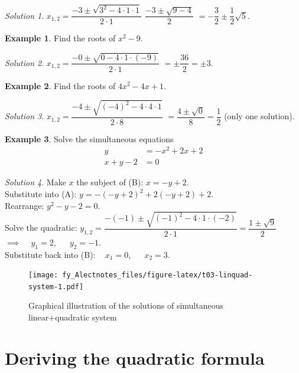 \documentclass[
  12pt,
  oneside]{book}
\theoremstyle{definition}
\theoremstyle{definition}
\newtheorem{example}{Example}[chapter]
\theoremstyle{definition}
\theoremstyle{definition}
\theoremstyle{remark}
\newtheorem*{solution}{Solution}
\begin{document}
\begin{solution}
\(x_{1,2}=\dfrac{-3\pm\sqrt{3^2-4\cdot1\cdot1}}{2\cdot 1}\) \(\dfrac{-3\pm\sqrt{9-4}}{2}\) \(=-\dfrac{3}{2}\pm\dfrac{1}{2}\sqrt{5}\).
\end{solution}

\begin{example}
Find the roots of \(x^2-9\).
\end{example}

\begin{solution}
\(x_{1,2}=\dfrac{-0\pm\sqrt{0-4\cdot1\cdot(-9)}}{2\cdot1}\) \(=\pm\dfrac{36}{2}=\pm 3\).
\end{solution}

\begin{example}
Find the roots of \(4x^2-4x+1\).
\end{example}

\begin{solution}
\(x_{1,2}=\dfrac{-4\pm\sqrt{(-4)^2-4\cdot 4\cdot 1}}{2\cdot 8}\) \(=\dfrac{4\pm\sqrt{0}}{8}=\dfrac{1}{2}\) (only one solution).
\end{solution}

\begin{example}
Solve the simultaneous equations
\begin{align*}
y &= -x^2+2x+2 \tag{A}\\
x+y-2 &=0 \tag{B}
\end{align*}
\end{example}

\begin{solution}
Make \(x\) the subject of (B): \(x=-y+2\).\\
Substitute into (A): \(y=-(-y+2)^2+2(-y+2)+2\).\\
Rearrange: \(y^2-y-2=0\).\\
Solve the quadratic: \(y_{1,2}=\dfrac{-(-1)\pm\sqrt{(-1)^2-4\cdot1\cdot(-2)}}{2\cdot1} = \dfrac{1\pm\sqrt{9}}{2}\)\\
\(\implies\) ~ \(y_1=2\), ~~ \(y_2=-1\).\\
Substitute back into (B): ~ \(x_1=0\), ~~ \(x_2=3\).
\end{solution}

\begin{figure}
\centering
\texttt{[image: fy\_Alectnotes\_files/figure-latex/t03-linquad-system-1.pdf]}
\caption{\label{fig:t03-linquad-system}Graphical illustration of the solutions of simultaneous linear+quadratic system}
\end{figure}

\hypertarget{deriving-the-quadratic-formula}{%
\section{Deriving the quadratic formula}\label{deriving-the-quadratic-formula}}
\end{document}
